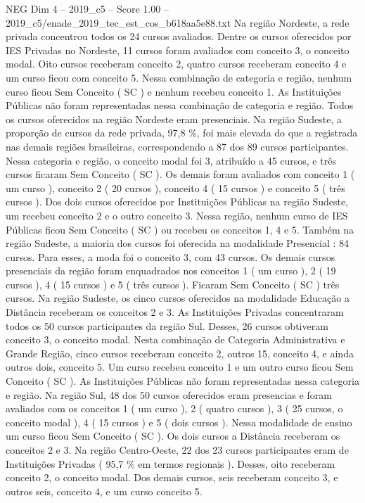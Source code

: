 \begin{textsample}{NEG Dim 4 – 2019\_c5 – Score 1.00 – 2019\_c5/enade\_2019\_tec\_est\_cos\_b618aa5e88.txt}
Na região Nordeste, a rede privada concentrou todos os 24 cursos avaliados.
Dentre os cursos oferecidos por IES Privadas no Nordeste, 11 cursos foram avaliados com conceito 3, o conceito modal.
Oito cursos receberam conceito 2, quatro cursos receberam conceito 4 e um curso ficou com conceito 5.
Nessa combinação de categoria e região, nenhum curso ficou Sem Conceito ( SC ) e nenhum recebeu conceito 1.
As Instituições Públicas não foram representadas nessa combinação de categoria e região.
Todos os cursos oferecidos na região Nordeste eram presenciais.
Na região Sudeste, a proporção de cursos da rede privada, 97,8 \%, foi mais elevada do que a registrada nas demais regiões brasileiras, correspondendo a 87 dos 89 cursos participantes.
Nessa categoria e região, o conceito modal foi 3, atribuído a 45 cursos, e três cursos ficaram Sem Conceito ( SC ).
Os demais foram avaliados com conceito 1 ( um curso ), conceito 2 ( 20 cursos ), conceito 4 ( 15 cursos ) e conceito 5 ( três cursos ).
Dos dois cursos oferecidos por Instituições Públicas na região Sudeste, um recebeu conceito 2 e o outro conceito 3.
Nessa região, nenhum curso de IES Públicas ficou Sem Conceito ( SC ) ou recebeu os conceitos 1, 4 e 5.
Também na região Sudeste, a maioria dos cursos foi oferecida na modalidade Presencial : 84 cursos.
Para esses, a moda foi o conceito 3, com 43 cursos.
Os demais cursos presenciais da região foram enquadrados nos conceitos 1 ( um curso ), 2 ( 19 cursos ), 4 ( 15 cursos ) e 5 ( três cursos ).
Ficaram Sem Conceito ( SC ) três cursos.
Na região Sudeste, os cinco cursos oferecidos na modalidade Educação a Distância receberam os conceitos 2 e 3.
As Instituições Privadas concentraram todos os 50 cursos participantes da região Sul.
Desses, 26 cursos obtiveram conceito 3, o conceito modal.
Nesta combinação de Categoria Administrativa e Grande Região, cinco cursos receberam conceito 2, outros 15, conceito 4, e ainda outros dois, conceito 5.
Um curso recebeu conceito 1 e um outro curso ficou Sem Conceito ( SC ).
As Instituições Públicas não foram representadas nessa categoria e região.
Na região Sul, 48 dos 50 cursos oferecidos eram presencias e foram avaliados com os conceitos 1 ( um curso ), 2 ( quatro cursos ), 3 ( 25 cursos, o conceito modal ), 4 ( 15 cursos ) e 5 ( dois cursos ).
Nessa modalidade de ensino um curso ficou Sem Conceito ( SC ).
Os dois cursos a Distância receberam os conceitos 2 e 3.
Na região Centro-Oeste, 22 dos 23 cursos participantes eram de Instituições Privadas ( 95,7 \% em termos regionais ).
Desses, oito receberam conceito 2, o conceito modal.
Dos demais cursos, seis receberam conceito 3, e outros seis, conceito 4, e um curso conceito 5.

\end{textsample}
